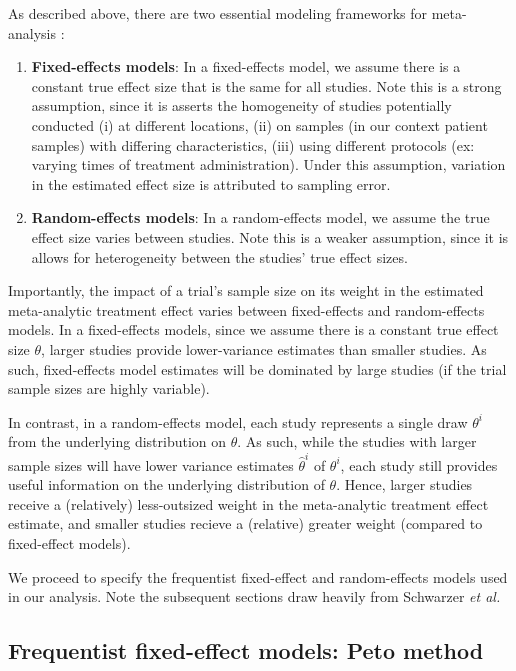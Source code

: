 \documentclass[fleqn,10pt]{SelfArx} %
\begin{document}
As described above, there are two essential modeling frameworks for meta-analysis \cite{Hedges}:
\begin{enumerate}
\item \textbf{Fixed-effects models}: In a fixed-effects model, we assume there is a constant true effect size that is the same for all studies. Note this is a strong assumption, since it is asserts the homogeneity of studies potentially conducted (i) at different locations, (ii) on samples (in our context patient samples) with differing characteristics, (iii) using different protocols (ex: varying times of treatment administration). Under this assumption, variation in the estimated effect size is attributed to sampling error.
\item \textbf{Random-effects models}: In a random-effects model, we assume the true effect size varies between studies. Note this is a weaker assumption, since it is allows for heterogeneity between the studies' true effect sizes.
\end{enumerate}

Importantly, the impact of a trial's sample size on its weight in the estimated meta-analytic treatment effect varies between fixed-effects and random-effects models. In a fixed-effects models, since we assume there is a constant true effect size $\theta$, larger studies provide lower-variance estimates than smaller studies. As such, fixed-effects model estimates will be dominated by large studies (if the trial sample sizes are highly variable).

In contrast, in a random-effects model, each study represents a single draw $\theta^i$ from the underlying distribution on $\theta$. As such, while the studies with larger sample sizes will have lower variance estimates $\hat{\theta}^i$ of $\theta^i$, each study still provides useful information on the underlying distribution of $\theta$. Hence, larger studies receive a (relatively) less-outsized weight in the meta-analytic treatment effect estimate, and smaller studies recieve a (relative) greater weight (compared to fixed-effect models).

We proceed to specify the frequentist fixed-effect and random-effects models used in our analysis. Note the subsequent sections draw heavily from Schwarzer \emph{et al.} \cite{Methods}

\subsection*{Frequentist fixed-effect models: Peto method}
\end{document}
